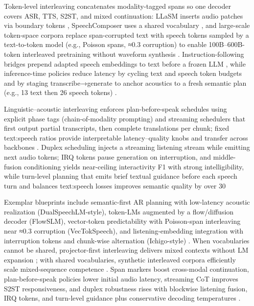 Token-level interleaving concatenates modality-tagged spans so one decoder covers ASR, TTS, S2ST, and mixed continuation: LLaSM inserts audio patches via boundary tokens \cite{shu2023llasmlargelanguagespeechmodel}, SpeechComposer uses a shared vocabulary \cite{wu2024speechcomposerunifyingmultiplespeechtask}, and large-scale token-space corpora replace span-corrupted text with speech tokens sampled by a text-to-token model (e.g., Poisson spans, ≈0.3 corruption) to enable 100B–600B-token interleaved pretraining without waveform synthesis \cite{zeng2024scalingspeechtextpretrainingsyntheticint}. Instruction-following bridges prepend adapted speech embeddings to text before a frozen LLM \cite{wang2023slmbridgethingapbetweenspeechtextfoundat}, while inference-time policies reduce latency by cycling text and speech token budgets and by staging transcribe→generate to anchor acoustics to a fresh semantic plan (e.g., 13 text then 26 speech tokens) \cite{zeng2024glm4voicetowardsintelligenthumanlikeends}.

Linguistic–acoustic interleaving enforces plan-before-speak schedules using explicit phase tags (chain-of-modality prompting) and streaming schedulers that first output partial transcripts, then complete translations per chunk; fixed text:speech ratios provide interpretable latency–quality knobs and transfer across backbones \cite{zeng2024scalingspeechtextpretrainingsyntheticint,guo2025streamuniachievingstreamingspeechtransla,zeng2024glm4voicetowardsintelligenthumanlikeends}. Duplex scheduling injects a streaming listening stream while emitting next audio tokens; IRQ tokens pause generation on interruption, and middle-fusion conditioning yields near-ceiling interactivity F1 with strong intelligibility, while turn-level planning that emits brief textual guidance before each speech turn and balances text:speech losses improves semantic quality by over 30%

Exemplar blueprints include semantic-first AR planning with low-latency acoustic realization (DualSpeechLM-style), token-LMs augmented by a flow/diffusion decoder (FlowSLM), vector-token predictability with Poisson-span interleaving near ≈0.3 corruption (VecTokSpeech), and listening-embedding integration with interruption tokens and chunk-wise alternation (Ichigo-style) \cite{zeng2024scalingspeechtextpretrainingsyntheticint}. When vocabularies cannot be shared, projector-first interleaving delivers mixed contexts without LM expansion \cite{wang2023slmbridgethingapbetweenspeechtextfoundat}; with shared vocabularies, synthetic interleaved corpora efficiently scale mixed-sequence competence \cite{zeng2024scalingspeechtextpretrainingsyntheticint}. Span markers boost cross-modal continuation, plan-before-speak policies lower initial audio latency, streaming CoT improves S2ST responsiveness, and duplex robustness rises with blockwise listening fusion, IRQ tokens, and turn-level guidance plus conservative decoding temperatures \cite{zeng2024glm4voicetowardsintelligenthumanlikeends,guo2025streamuniachievingstreamingspeechtransla,ma2024languagemodelcanlistenwhilespeaking,cui2025thinkbeforeyoutalkenhancingmeaningfuldia}.

